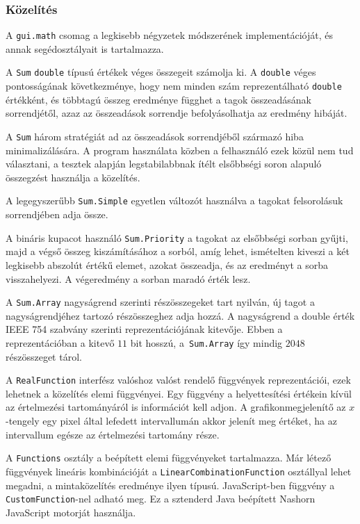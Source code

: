 \subsubsection{Közelítés}

A \texttt{gui.math} csomag a legkisebb négyzetek módszerének implementációját, és annak segédosztályait is tartalmazza.

A \texttt{Sum} \texttt{double} típusú értékek véges összegeit számolja ki.
A \texttt{double} véges pontosságának következménye, hogy nem minden szám reprezentálható \texttt{double} értékként, és többtagú összeg eredménye függhet a tagok összeadásának sorrendjétől, azaz az összeadások sorrendje befolyásolhatja az eredmény hibáját.

A \texttt{Sum} három stratégiát ad az összeadások sorrendjéből származó hiba minimalizálására.
A program használata közben a felhasználó ezek közül nem tud választani, a tesztek alapján legstabilabbnak ítélt elsőbbségi soron alapuló összegzést használja a közelítés.

A legegyszerűbb \texttt{Sum.Simple} egyetlen változót használva a tagokat felsorolásuk sorrendjében adja össze.

A bináris kupacot használó \texttt{Sum.Priority} a tagokat az elsőbbségi sorban gyűjti, majd a végső összeg kiszámításához a sorból, amíg lehet, ismételten kiveszi a két legkisebb abszolút értékű elemet, azokat összeadja, és az eredményt a sorba visszahelyezi.
A végeredmény a sorban maradó érték lesz.

A \texttt{Sum.Array} nagyságrend szerinti részösszegeket tart nyilván, új tagot a nagyságrendjéhez tartozó részösszeghez adja hozzá.
A nagyságrend a double érték IEEE 754 szabvány szerinti reprezentációjának kitevője. Ebben a reprezentációban a kitevő $11$ bit hosszú, a\texttt{ Sum.Array} így mindig $2048$ részösszeget tárol.

A \texttt{RealFunction} interfész valóshoz valóst rendelő függvények reprezentációi, ezek lehetnek a közelítés elemi függvényei.
Egy függvény a helyettesítési értékein kívül az értelmezési tartományáról is információt kell adjon.
A grafikonmegjelenítő az $x$-tengely egy pixel által lefedett intervallumán akkor jelenít meg értéket, ha az intervallum egésze az értelmezési tartomány része.

A \texttt{Functions} osztály a beépített elemi függvényeket tartalmazza.
Már létező függvények lineáris kombinációját a \texttt{LinearCombinationFunction} osztállyal lehet megadni, a mintaközelítés eredménye ilyen típusú.
JavaScript-ben függvény a \texttt{CustomFunction}-nel adható meg.
Ez a sztenderd Java beépített Nashorn JavaScript motorját használja.

